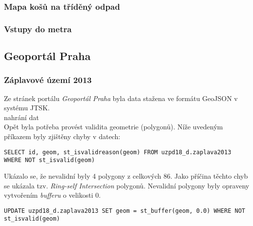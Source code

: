 \documentclass[a4paper, 12pt]{article}
\begin{document}
\subsubsection*{Mapa košů na tříděný odpad}

\subsubsection*{Vstupy do metra}

\subsection{Geoportál Praha}
\subsubsection*{Záplavové území 2013}
Ze stránek portálu \textit{Geoportál Praha} byla data stažena ve formátu GeoJSON v systému JTSK.\\

nahrání dat \\
Opět byla potřeba provést validita geometrie (polygonů). Níže uvedeným příkazem byly zjištěny chyby v datech:
\begin{lstlisting}
SELECT id, geom, st_isvalidreason(geom) FROM uzpd18_d.zaplava2013 WHERE NOT st_isvalid(geom)
\end{lstlisting}
Ukázalo se, že nevalidní byly 4 polygony z celkových 86. Jako příčina těchto chyb se ukázala tzv. \textit{Ring-self Intersection} polygonů. Nevalidní polygony byly opraveny vytvoře\-ním \textit{bufferu} o velikosti 0. 

\begin{lstlisting}
UPDATE uzpd18_d.zaplava2013 SET geom = st_buffer(geom, 0.0) WHERE NOT st_isvalid(geom)
\end{lstlisting}
\end{document}
